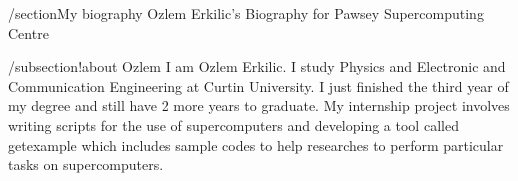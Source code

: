 /section{My biography}
Ozlem Erkilic's Biography for Pawsey Supercomputing Centre

/subsection{!about Ozlem }
I am Ozlem Erkilic. I study Physics and Electronic and Communication
Engineering at Curtin University. I just finished the third year of my degree
and still have 2 more years to graduate.
My internship project involves writing scripts for the use of supercomputers
and developing a tool called getexample which includes sample codes to help
researches to perform particular tasks on supercomputers. 
